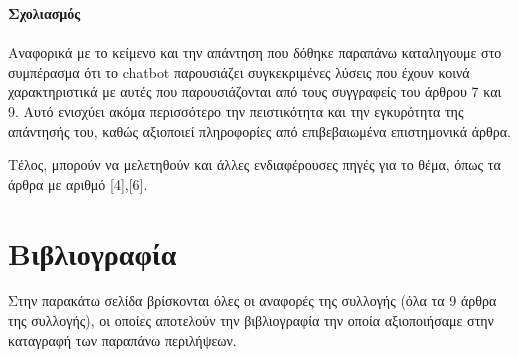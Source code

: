 \documentclass{report}
\begin{document}
\newpage
\textbf{Σχολιασμός}\\\\
Αναφορικά με το κείμενο και την απάντηση που δόθηκε παραπάνω καταληγουμε στο συμπέρασμα ότι το chatbot παρουσιάζει συγκεκριμένες λύσεις που έχουν κοινά χαρακτηριστικά με αυτές που παρουσιάζονται από τους συγγραφείς του άρθρου 7 και 9. Αυτό ενισχύει ακόμα περισσότερο την πειστικότητα και την εγκυρότητα της απάντησής του, καθώς αξιοποιεί πληροφορίες από επιβεβαιωμένα επιστημονικά άρθρα. 


Τέλος, μπορούν να μελετηθούν και άλλες ενδιαφέρουσες πηγές για το θέμα, όπως τα άρθρα με αριθμό [4],[6].

\chapter{Βιβλιογραφία}
Στην παρακάτω σελίδα βρίσκονται όλες οι αναφορές της συλλογής (όλα τα 9 άρθρα της συλλογής), οι οποίες αποτελούν την βιβλιογραφία την οποία αξιοποιήσαμε στην καταγραφή των παραπάνω περιλήψεων.
\end{document}
